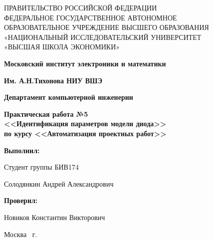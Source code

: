 \begin{titlepage}
	\begin{center}
		ПРАВИТЕЛЬСТВО РОССИЙСКОЙ ФЕДЕРАЦИИ \\
 		ФЕДЕРАЛЬНОЕ  ГОСУДАРСТВЕННОЕ АВТОНОМНОЕ \\
		ОБРАЗОВАТЕЛЬНОЕ УЧРЕЖДЕНИЕ ВЫСШЕГО ОБРАЗОВАНИЯ\\
		«НАЦИОНАЛЬНЫЙ ИССЛЕДОВАТЕЛЬСКИЙ УНИВЕРСИТЕТ\\
		«ВЫСШАЯ ШКОЛА ЭКОНОМИКИ»
	\end{center}
	
	\begin{center}
		\textbf{Московский институт электроники и математики}
		
		\textbf{Им. А.Н.Тихонова НИУ ВШЭ}
		
		\vspace{2ex}
		
		\textbf{Департамент компьютерной инженерии}
	\end{center}
	\vspace{1ex}	
	
	\vspace{1ex}
	\begin{center}
		\textbf{Практическая работа №5 \\
			<<Идентификация параметров модели диода>> \\
			по курсу <<Автоматизация проектных работ>>\\
	}
	\end{center}	

	\vspace{2ex}
	\vfill
	
	\vspace{2ex}
	
	\begin{flushright}
		\textbf{Выполнил:}
		
		\vspace{2ex}
		
		Студент группы БИВ174
		
		\vspace{2ex}
		
		Солодянкин Андрей Александрович
		
		\vspace{2ex}
		
		\textbf{Проверил:}
		
		\vspace{2ex}
		
		Новиков Константин Викторович
	\end{flushright}

	\vspace{5ex}
	\begin{center}
		Москва \the\year \, г.
	\end{center}
	
\end{titlepage}
\addtocounter{page}{1}